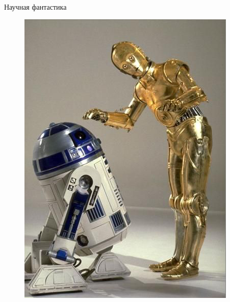 \documentclass[10pt]{beamer}
\begin{document}
\begin{frame} {Научная фантастика}
	\begin{figure}
		\centering
		\begin{minipage}{.33\textwidth}
		  \includegraphics[width=0.9 \linewidth, height=0.9 \textheight, keepaspectratio]{images/c3po_r2d2}
		\end{minipage}%
		\begin{minipage}{.33\textwidth}
				\begin{minipage}{\textwidth}

\end{minipage}
\end{minipage}
\end{figure}
\end{frame}
\end{document}

